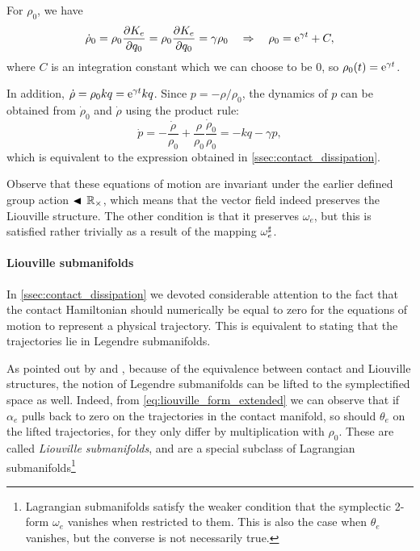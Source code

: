 For $\rho_0$, we have
$$ \dot{\rho}_0 = \rho_0 \pdv{K_e}{q_0} = \rho_0 \pdv{K_e}{q_0}  = \gamma\rho_0 \quad \Rightarrow \quad \rho_0 = \mathrm{e}^{\gamma t} + C, $$ 
where $C$ is an integration constant which we can choose to be 0, so $\rho_0(t) = \mathrm{e}^{\gamma t}$.

In addition, $\dot{\rho} = \rho_0 kq = \mathrm{e}^{\gamma t} kq$. Since $p = -\rho/\rho_0$, the dynamics of $p$ can be obtained from  $\dot{\rho}_0$ and $\dot{\rho}$ using the product rule:
\begin{equation} 
    \dot{p} = -\frac{\dot{\rho}}{\rho_0} + \frac{\rho}{\rho_0}\frac{\dot{\rho}_0}{\rho_0} = -kq - \gamma p,
    \label{eq:pdot}
\end{equation}
which is equivalent to the expression obtained in \cref{ssec:contact_dissipation}.

Observe that these equations of motion are invariant under the earlier defined group action $\blacktriangleleft\,\mathbb{R}_{\times}$, which means that the vector field indeed preserves the Liouville structure. The other condition is that it preserves $\omega_e$, but this is satisfied rather trivially as a result of the mapping $\omega_e^\sharp$.

\paragraph{Liouville submanifolds} In \cref{ssec:contact_dissipation} we devoted considerable attention to the fact that the contact Hamiltonian should numerically be equal to zero for the equations of motion to represent a physical trajectory. This is equivalent to stating that the trajectories lie in Legendre submanifolds.

As pointed out by \citet{VanderSchaft2021a} and \citet{Libermann1987}, because of the equivalence between contact and Liouville structures, the notion of Legendre submanifolds can be lifted to the symplectified space as well. Indeed, from \cref{eq:liouville_form_extended} we can observe that if $\alpha_e$ pulls back to zero on the trajectories in the contact manifold, so should $\theta_e$ on the lifted trajectories, for they only differ by multiplication with $\rho_0$. These are called \emph{Liouville submanifolds}, and are a special subclass of Lagrangian submanifolds\footnote{Lagrangian submanifolds satisfy the weaker condition that the symplectic 2-form $\omega_e$ vanishes when restricted to them. This is also the case when $\theta_e$ vanishes, but the converse is not necessarily true.}


